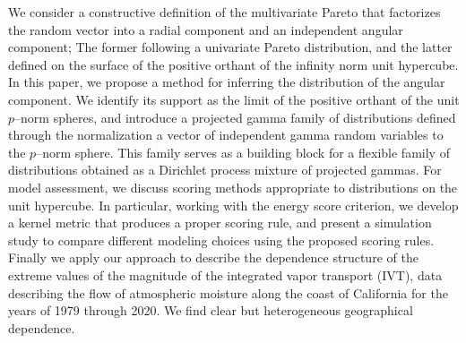 We consider a constructive definition of the multivariate Pareto that factorizes the 
random vector into a radial component and an independent angular component; The former
following a univariate Pareto distribution, and the latter defined on the surface of the 
positive orthant of the infinity norm unit hypercube.  In this paper, we  propose a method 
for inferring the distribution of the angular component.  We identify its support 
as the limit of the positive orthant of the unit $p$--norm spheres, and introduce a 
projected gamma family of distributions defined through the normalization a vector of 
independent gamma random variables to the $p$--norm sphere.  This family serves as a 
building block for a flexible family of distributions obtained as a Dirichlet process 
mixture of projected gammas.  For model assessment, we discuss scoring methods appropriate 
to distributions on the unit hypercube.  In particular, working with the energy score
criterion, we develop a kernel metric that produces a  proper scoring rule, and present 
a simulation study to compare  different modeling choices using the proposed scoring rules.  
Finally we apply our  approach to describe the dependence structure of the extreme values of 
the magnitude  of the integrated vapor transport (IVT), data describing the flow 
of atmospheric moisture along the coast of California for the years of 1979 
through 2020.  We find clear but heterogeneous geographical dependence.


